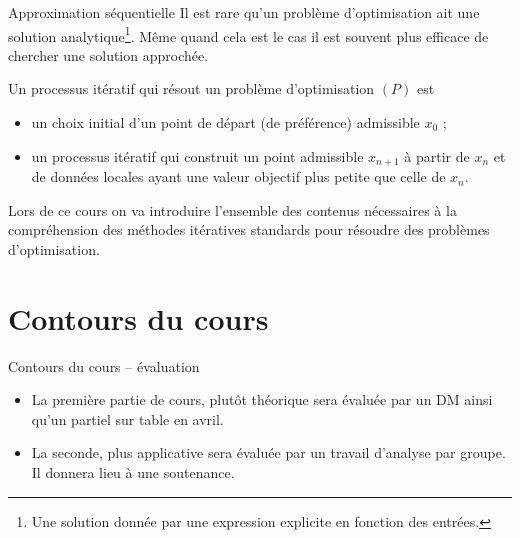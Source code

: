 \documentclass[aspectratio = 169]{beamer}
\begin{document}
\begin{frame}{Approximation séquentielle}
  Il est rare qu'un problème d'optimisation ait une solution
  analytique\footnote{Une solution donnée par une expression explicite
    en fonction des entrées.}. Même quand cela est le cas il est
  souvent plus efficace de chercher une solution approchée.

  Un processus itératif qui résout un problème d'optimisation $(P)$
  est
  \begin{itemize}
  \item<2-> un choix initial d'un point de départ (de préférence)
    admissible $x_0$ ;
  \item<3-> un processus itératif qui construit un point admissible
    $x_{n+1}$ à partir de $x_n$ et de données locales ayant une valeur
    objectif plus petite que celle de $x_n$.
  \end{itemize}
  \pause[4]
  Lors de ce cours on va introduire l'ensemble des contenus
  nécessaires à la compréhension des méthodes itératives standards
  pour résoudre des problèmes d'optimisation.
\end{frame}

\section{Contours du cours}

\begin{frame}{Contours du cours -- évaluation}
  \begin{itemize}
  \item
    La première partie de cours, plutôt théorique sera évaluée par un DM
    ainsi qu'un partiel sur table en avril.
  \item
    La seconde, plus applicative
    sera évaluée par un travail d'analyse par groupe. Il donnera lieu à
    une soutenance.
  \end{itemize}
\end{frame}
\end{document}
